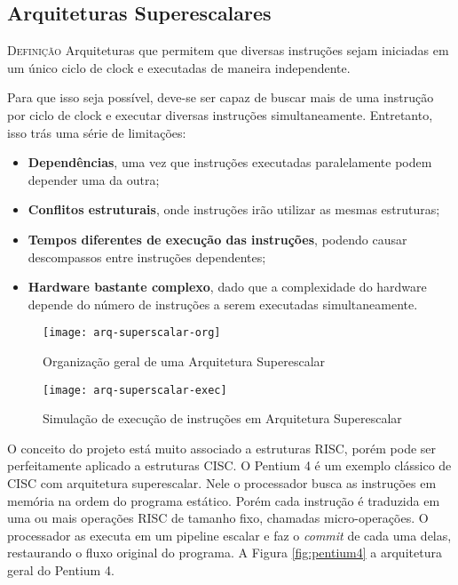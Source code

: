 \subsection{Arquiteturas Superescalares}

\textsc{Definição} Arquiteturas que permitem que diversas instruções sejam iniciadas em um único ciclo de clock e executadas de maneira independente.

Para que isso seja possível, deve-se ser capaz de buscar mais de uma instrução
por ciclo de clock e executar diversas instruções simultaneamente. Entretanto, isso trás uma série de limitações:
\begin{itemize}
  \item \textbf{Dependências}, uma vez que instruções executadas paralelamente podem depender uma da outra;

  \item \textbf{Conflitos estruturais}, onde instruções irão utilizar as mesmas estruturas;

  \item \textbf{Tempos diferentes de execução das instruções}, podendo causar descompassos entre instruções dependentes;

  \item \textbf{Hardware bastante complexo}, dado que a complexidade do hardware depende do número de instruções a serem executadas simultaneamente.
\end{itemize}

\begin{figure}[ht]
  \centering
  \texttt{[image: arq-superscalar-org]}
  \caption{Organização geral de uma Arquitetura Superescalar}
  \label{fig:arq-superscalar-org}
\end{figure}

\begin{figure}[ht]
  \centering
  \texttt{[image: arq-superscalar-exec]}
  \caption{Simulação de execução de instruções em Arquitetura Superescalar}
  \label{fig:arq-superscalar-exec}
\end{figure}

O conceito do projeto está muito associado a estruturas RISC, porém pode ser perfeitamente aplicado a estruturas CISC. O Pentium 4 é um exemplo clássico de CISC com arquitetura superescalar. Nele o processador busca as instruções em memória na ordem do programa estático. Porém cada instrução é traduzida em uma ou mais operações RISC de tamanho fixo, chamadas micro-operações. O processador as executa em um pipeline escalar e faz o \textit{commit} de cada uma delas, restaurando o fluxo original do programa. A Figura \ref{fig:pentium4} a arquitetura geral do Pentium 4.

